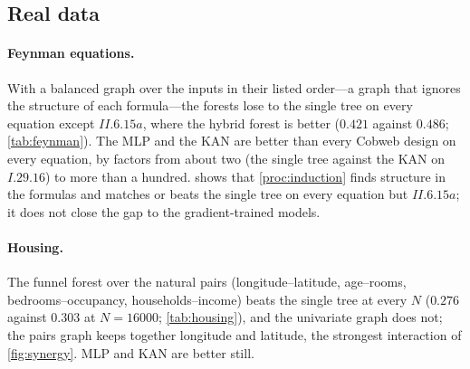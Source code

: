\documentclass[11pt]{article}
\theoremstyle{definition}
\theoremstyle{remark}
\begin{document}
\subsection{Real data}

\begin{table}[t]
\centering\small
\resizebox{\linewidth}{!}{}
\caption{Feynman equations, $N=4000$: test RMSE$/\mathrm{sd}(f)$, mean of three seeds;
forests use a balanced graph over the inputs in their listed order.}
\label{tab:feynman}
\end{table}

\begin{table}[t]
\centering\small
\resizebox{\linewidth}{!}{}
\caption{California housing: test RMSE of the log median value (three seeds).}
\label{tab:housing}
\end{table}


\begin{table}[t]
\centering\small

\caption{Next word on OpenWebText from the previous four words (2000-word vocabulary):
top-1 accuracy (\%) / cross-entropy (nats).  An accuracy of 20.9 is the frequency of the
unknown-word token.}
\label{tab:owt}
\end{table}

\paragraph{Feynman equations.}
With a balanced graph over the inputs in their listed order---a graph that ignores the
structure of each formula---the forests lose to the single tree on every equation except
$II.6.15a$, where the hybrid forest is better ($0.421$ against $0.486$; \cref{tab:feynman}).
The MLP and the KAN are better than every Cobweb design on every equation, by factors from
about two (the single tree against the KAN on $I.29.16$) to more than a hundred.
 shows that \cref{proc:induction} finds structure in the formulas and
matches or beats the single tree on every equation but $II.6.15a$; it does not close the
gap to the gradient-trained models.

\paragraph{Housing.}
The funnel forest over the natural pairs (longitude--latitude, age--rooms,
bedrooms--occupancy, households--income) beats the single tree at every $N$
($0.276$ against $0.303$ at $N=16000$; \cref{tab:housing}), and the univariate graph
does not; the pairs graph keeps together longitude and latitude, the strongest
interaction of \cref{fig:synergy}.  MLP and KAN are better still.
\end{document}
